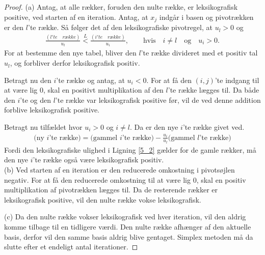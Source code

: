 \begin{proof}
(a) Antag, at alle rækker, foruden den nulte række, er leksikografisk positive, ved starten af en iteration. Antag, at $x_j$ indgår i basen og pivotrækken er den $l$'te række. 
Så følger det af den leksikografiske pivotregel, at $u_l>0$ og
\begin{align}
\frac{(l'te \quad række)}{u_l} \overset{L}{<} \frac{(i'te \quad række)}{u_i}, \quad \quad \text{hvis} \quad  i \neq l \quad \text{og} \quad u_i>0.
\label{5_2}
\end{align}
For at bestemme den nye tabel, bliver den $l$'te række divideret med et positiv tal $u_l$, og forbliver derfor leksikografisk positiv. 

Betragt nu den $i$'te række og antag, at $u_i<0$. For at få den $(i,j)$'te indgang til at være lig $0$, skal en positivt multiplikation af den $l$'te række lægges til. Da både den $i$'te og den $l$'te række var leksikografisk positive før, vil de ved denne addition forblive leksikografisk positive.

Betragt nu tilfældet hvor $u_i>0$ og $i \neq l$. Da er den nye $i$'te række givet ved. 
\begin{align*}
(\text{ny $i$'te række)}=\text{(gammel $i$'te række)}-\frac{u_i}{u_l}\text{(gammel $l$'te række)}
\end{align*}  
Fordi den leksikografiske ulighed i Ligning \ref{5_2} gælder for de gamle rækker, må den nye $i$'te række også være leksikografisk positiv. \\
(b) Ved starten af en iteration er den reducerede omkostning i pivotsøjlen negativ. For at få den reducerede omkostning til at være lig $0$, skal en positiv multiplikation af pivotrækken lægges til. 
Da de resterende rækker er leksikografisk positive, vil den nulte række vokse leksikografisk. 

(c) Da den nulte række vokser leksikografisk ved hver iteration, vil den aldrig komme tilbage til en tidligere værdi. Den nulte række afhænger af den aktuelle basis, derfor vil den samme basis aldrig blive gentaget. Simplex metoden må da slutte efter et endeligt antal iterationer. 
\end{proof}

